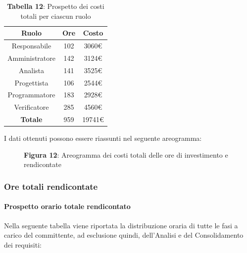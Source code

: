 \begin{table}[H]
	\centering
	\renewcommand{\arraystretch}{1.5}
	\begin{tabular}{|c|c|c|}
		\hline
		\rowcolor{lighter-grayer}
Ruolo & Ore & Costo \\ \hline
Responsabile & 102 & 3060\euro \\ \hline
Amministratore & 142 & 3124\euro \\ \hline
Analista & 141 & 3525\euro \\ \hline
Progettista & 106 & 2544\euro \\ \hline
Programmatore & 183 & 2928\euro \\ \hline
Verificatore & 285 & 4560\euro \\ \hline
\textbf{Totale} & 959 & 19741\euro \\ \hline
	\end{tabular}
	\caption*{\textbf{Tabella 12}: Prospetto dei costi totali per ciascun ruolo \\}
\end{table}

I dati ottenuti possono essere riassunti nel seguente areogramma:


\begin{figure}[H]
	\centering
	\caption*{\textbf{Figura 12}: Areogramma dei costi totali delle ore di investimento e rendicontate}
    \label{fig:Figura10}
\end{figure}

\subsubsection{Ore totali rendicontate}
\paragraph{Prospetto orario totale rendicontato}
Nella seguente tabella viene riportata la distribuzione oraria di tutte le fasi a carico del committente, ad esclusione quindi, dell'Analisi e del Consolidamento dei requisiti:

